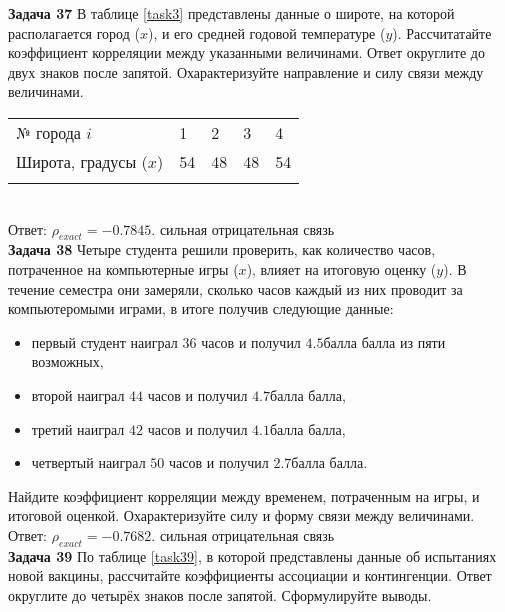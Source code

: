 \documentclass{article}
\begin{document}
\textbf{Задача 37} В таблице \ref{task3} представлены данные о широте, на которой располагается город ($x$), и его средней годовой температуре ($y$). Рассчитатайте коэффициент корреляции между указанными величинами. Ответ округлите до двух знаков после запятой. Охарактеризуйте направление и силу связи между величинами.\\

\begin{minipage}{\textwidth}
\centering
\begin{tabularx}{0.8\textwidth}{lYYYY}
\toprule
№ города $i$ & 1 & 2 & 3 & 4 \\
\cmidrule(lr){1-1}\cmidrule(lr){2-5}
Широта, градусы ($x$) & 54 & 48 & 48 & 54 \\
\addlinespace\bottomrule
\end{tabularx}
\label{task37}
\end{minipage} \\[35pt]

Ответ: $\rho_{exact} = -0.7845$. сильная отрицательная связь\\

\textbf{Задача 38} Четыре студента решили проверить, как количество часов, потраченное на компьютерные игры ($x$), влияет на итоговую оценку ($y$). В течение семестра они замеряли, сколько часов каждый из них проводит за компьютеромыми играми, в итоге получив следующие данные: \begin{itemize} \item первый студент наиграл $36$ часов и получил $4.5 балла$ балла из пяти возможных, \item второй наиграл $44$ часов и получил $4.7 балла$ балла, \item третий наиграл $42$ часов и получил $4.1 балла$ балла, \item четвертый наиграл $50$ часов и получил $2.7 балла$ балла. \end{itemize} Найдите коэффициент корреляции между временем, потраченным на игры, и итоговой оценкой. Охарактеризуйте силу и форму связи между величинами.\\

Ответ: $\rho_{exact} = -0.7682$. сильная отрицательная связь\\

\textbf{Задача 39} По таблице \ref{task39}, в которой представлены данные об испытаниях новой вакцины, рассчитайте коэффициенты ассоциации и контингенции. Ответ округлите до четырёх знаков после запятой. Сформулируйте выводы.\\
\end{document}
